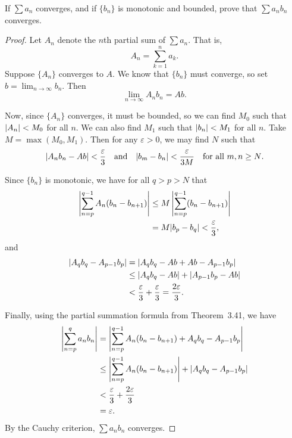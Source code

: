  If $\sum a_n$ converges, and if $\{b_n\}$ is monotonic and
bounded, prove that $\sum a_nb_n$ converges.
\begin{proof}
  Let $A_n$ denote the $n$th partial sum of $\sum a_n$. That is,
  \begin{equation*}
    A_n = \sum_{k=1}^n a_k.
  \end{equation*}
  Suppose $\{A_n\}$ converges to $A$. We know that $\{b_n\}$ must
  converge, so set $b = \lim_{n\to\infty}b_n$. Then
  \begin{equation*}
    \lim_{n\to\infty}A_nb_n = Ab.
  \end{equation*}

  Now, since $\{A_n\}$ converges, it must be bounded, so we can find
  $M_0$ such that $\lvert{A_n}\rvert < M_0$ for all $n$. We can also find
  $M_1$ such that $\lvert{b_n}\rvert < M_1$ for all $n$. Take
  $M = \max(M_0, M_1)$. Then for any $\varepsilon>0$, we may find $N$
  such that
  \begin{equation*}
    \lvert{A_nb_n - Ab}\rvert < \frac\varepsilon3
    \quad\text{and}\quad
    \lvert{b_m - b_n}\rvert < \frac{\varepsilon}{3M}
    \quad\text{for all $m,n\geq N$}.
  \end{equation*}

  Since $\{b_n\}$ is monotonic, we have for all $q > p > N$ that
  \begin{align*}
    \left\lvert{\sum_{n=p}^{q-1} A_n(b_n - b_{n+1})}\right\rvert
    &\leq M\left\lvert{\sum_{n=p}^{q-1}(b_n - b_{n+1})}\right\rvert \\
    &= M\lvert{b_p - b_q}\rvert < \frac{\varepsilon}3,
  \end{align*}
  and
  \begin{align*}
    \lvert{A_qb_q - A_{p-1}b_p}\rvert
    &= \lvert{A_qb_q - Ab + Ab - A_{p-1}b_p}\rvert \\
    &\leq \lvert{A_qb_q - Ab}\rvert + \lvert{A_{p-1}b_p - Ab}\rvert \\
    &< \frac\varepsilon3 + \frac\varepsilon3
    = \frac{2\varepsilon}3.
  \end{align*}

  Finally, using the partial summation formula from Theorem~3.41, we
  have
  \begin{align*}
    \left\lvert{\sum_{n=p}^q a_nb_n}\right\rvert
    &= \left\lvert{\sum_{n=p}^{q-1}A_n(b_n - b_{n+1}) + A_qb_q - A_{p-1}b_p}\right\rvert \\
    &\leq \left\lvert{\sum_{n=p}^{q-1}A_n(b_n - b_{n+1})}\right\rvert + \lvert{A_qb_q - A_{p-1}b_p}\rvert \\
    &< \frac\varepsilon3 + \frac{2\varepsilon}3 \\
    &= \varepsilon.
  \end{align*}
  By the Cauchy criterion, $\sum a_nb_n$ converges.
\end{proof}

